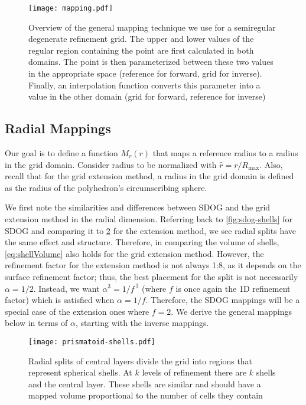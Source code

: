 \begin{figure}[ht!]
	\centering
	\texttt{[image: mapping.pdf]}
	\caption[Overview of mapping for semiregular degenerate refinement grids]{
		Overview of the general mapping technique we use for a semiregular degenerate refinement grid.
		The upper and lower values of the regular region containing the point are first calculated in both domains.
		The point is then parameterized between these two values in the appropriate space (reference for forward, grid for inverse).
		Finally, an interpolation function converts this parameter into a value in the other domain (grid for forward, reference for inverse)
	}
	\label{fig:mapping}
\end{figure}


\subsection{Radial Mappings} \label{chap:6:radial}
Our goal is to define a function $M_r(r)$ that maps a reference radius to a radius in the grid domain.
Consider radius to be normalized with $\hat{r} = r / R_\mathrm{max}$.
Also, recall that for the grid extension method, a radius in the grid domain is defined as the radius of the polyhedron's circumscribing sphere.


We first note the similarities and differences between SDOG and the grid extension method in the radial dimension.
Referring back to \cref{fig:sdog-shells} for SDOG and comparing it to \cref{fig:prismatoid-shells} for the extension method, we see radial splits have the same effect and structure.
Therefore, in comparing the volume of shells, \cref{eq:shellVolume} also holds for the grid extension method.
However, the refinement factor for the extension method is not always 1:8, as it depends on the surface refinement factor; thus, the best placement for the split is not necessarily $\alpha = 1/2$.
Instead, we want $\alpha^3 = 1 / f^{\ 3}$ (where $f$ is once again the 1D refinement factor) which is satisfied when $\alpha = 1/f$.
Therefore, the SDOG mappings will be a special case of the extension ones where $f = 2$.
We derive the general mappings below in terms of $\alpha$, starting with the inverse mappings.


\begin{figure}[ht!]
	\centering
	\texttt{[image: prismatoid-shells.pdf]}
	\caption[Spherical shells that result from the grid extension method]{
		Radial splits of central layers divide the grid into regions that represent spherical shells.
		At $k$ levels of refinement there are $k$ shells and the central layer.
		These shells are similar and should have a mapped volume proportional to the number of cells they contain
	}
	\label{fig:prismatoid-shells}
\end{figure}

